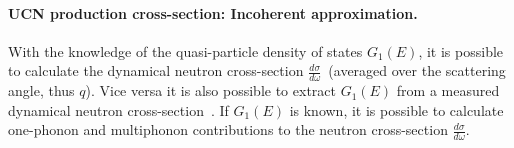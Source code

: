 \paragraph{UCN production cross-section: Incoherent approximation.}
With the knowledge of the quasi-particle density of states $G_1(E)$,
it is possible to calculate the dynamical neutron cross-section
$\frac{d\sigma}{d\omega}$~(averaged over the scattering angle, thus
$q$). Vice versa it is also possible to extract $G_1(E)$ from a
measured dynamical neutron cross-section~\cite{Turchin}.  If
$G_1(E)$ is known, it is possible to calculate one-phonon and
multiphonon contributions to the neutron cross-section
$\frac{d\sigma}{d\omega}$.


